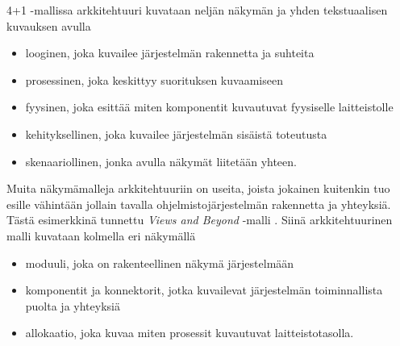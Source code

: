 \documentclass[finnish]{tktltiki2}
\numberwithin{table}{section}
\theoremstyle{definition}
\theoremstyle{remark}
\begin{document}
4+1 -mallissa arkkitehtuuri kuvataan neljän näkymän ja yhden tekstuaalisen kuvauksen avulla 

\begin{itemize}
	\item looginen, joka kuvailee järjestelmän rakennetta ja suhteita
	\item prosessinen, joka keskittyy suorituksen kuvaamiseen
	\item fyysinen, joka esittää miten komponentit kuvautuvat fyysiselle laitteistolle
	\item kehityksellinen, joka kuvailee järjestelmän sisäistä toteutusta
	\item skenaariollinen, jonka avulla näkymät liitetään yhteen.
\end{itemize}


Muita näkymämalleja arkkitehtuuriin on useita, joista jokainen kuitenkin tuo esille vähintään jollain tavalla ohjelmistojärjestelmän rakennetta ja yhteyksiä. Tästä esimerkkinä tunnettu \textit{Views and Beyond} -malli \citep{Clements:2002:DSA:599933}. Siinä arkkitehtuurinen malli kuvataan kolmella eri näkymällä

\begin{itemize}
	\item moduuli, joka on rakenteellinen näkymä järjestelmään
	\item komponentit ja konnektorit, jotka kuvailevat järjestelmän toiminnallista puolta ja yhteyksiä
	\item allokaatio, joka kuvaa miten prosessit kuvautuvat laitteistotasolla.
\end{itemize}

\end{document}
